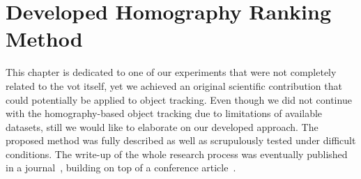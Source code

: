 \chapter{Developed Homography Ranking Method}
\label{chap:HomographyRanking}

This chapter is dedicated to one of our experiments that were not completely related to the \gls{vot} itself, yet we achieved an original scientific contribution that could potentially be applied to object tracking. Even though we did not continue with the homography-based object tracking due to limitations of available datasets, still we would like to elaborate on our developed approach. The proposed method was fully described as well as scrupulously tested under difficult conditions. The write-up of the whole research process was eventually published in a journal~\cite{ondrasovic2021homography}, building on top of a conference article~\cite{ondrasovic2020foundations}.






